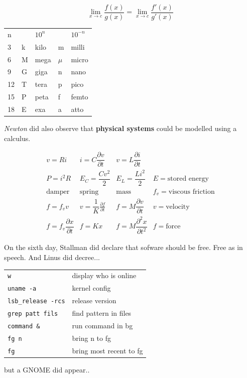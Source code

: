 \documentclass[a4paper,12pt]{article}
\begin{document}
\begin{multicols}{2}
\[\mathop {\lim }\limits_{x \to c} \frac{{f\left( x \right)}}{{g\left( x
\right)}} = \mathop {\lim }\limits_{x \to c} \frac{{f'\left( x
\right)}}{{g'\left( x \right)}}\]

\begin{tabular}{lllll}
n&& $10^n$&&$10^{-n}$\\
3& k & kilo & m & milli\\
6& M & mega & $\mu$ & micro\\
9& G & giga & n & nano\\
12& T & tera & p & pico\\
15& P & peta & f & femto\\
18& E & exa & a & atto
\end{tabular}

\vfill
\emph{Newton} did  also observe that \textbf{physical systems} could be
modelled using a calculus.

\[
\begin{array}{cccl}
v = Ri&i = C\dfrac{\partial v}{\partial t}&v = L\dfrac{\partial i}{\partial
t}\\

P = i^2R & E_C = \dfrac{Cv^2}{2} & E_L = \dfrac{Li^2}{2}& E = \mbox{stored
energy}\\

\mbox{damper}&\mbox{spring}&\mbox{mass}&f_v = \mbox{viscous friction}\\
f = f_v v   & v = \dfrac{1}{K}\frac{\partial f}{\partial t}&f =
M\dfrac{\partial v}{\partial t}&v = \mbox{velocity}\\ f = f_v\dfrac{\partial
x}{\partial t}    &   f=Kx    & f = M \dfrac{\partial^2 x}{\partial t^2}&f =
\mbox{force}
\end{array}
\]

\columnbreak

On the sixth day, Stallman did declare that sofware should be free. Free as in
speech. And Linus did decree...

\begin{tabular}{ll}
\texttt{w}& display who is online\\
\texttt{uname -a}& kernel config\\
\texttt{lsb\_release -rcs}& release version\\
\texttt{grep patt fils}& find pattern in files\\
\texttt{command \&}& run command in bg\\
\texttt{fg n}& bring n to fg\\
\texttt{fg}& bring most recent to fg\\
\end{tabular}
\vfill
\bigskip
but a GNOME did appear..


\end{multicols}
\end{document}
